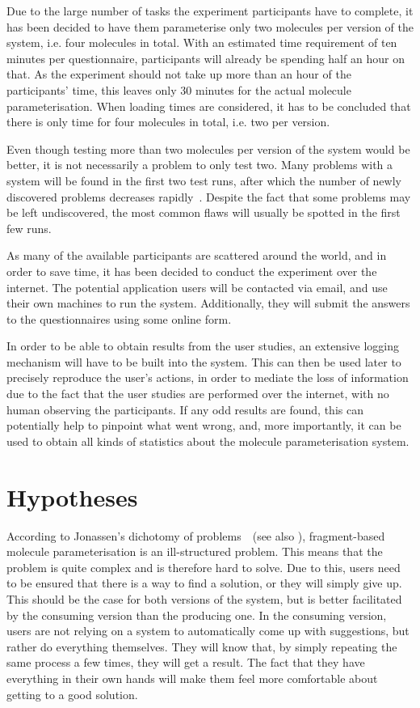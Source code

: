 Due to the large number of tasks the experiment participants have to complete, it has been decided to have them parameterise only two molecules per version of the system, i.e. four molecules in total. With an estimated time requirement of ten minutes per questionnaire, participants will already be spending half an hour on that. As the experiment should not take up more than an hour of the participants' time, this leaves only 30 minutes for the actual molecule parameterisation. When loading times are considered, it has to be concluded that there is only time for four molecules in total, i.e. two per version.

Even though testing more than two molecules per version of the system would be better, it is not necessarily a problem to only test two. Many problems with a system will be found in the first two test runs, after which the number of newly discovered problems decreases rapidly~\cite{krug2006dont, nielsen2000you}. Despite the fact that some problems may be left undiscovered, the most common flaws will usually be spotted in the first few runs.

As many of the available participants are scattered around the world, and in order to save time, it has been decided to conduct the experiment over the internet. The potential application users will be contacted via email, and use their own machines to run the system. Additionally, they will submit the answers to the questionnaires using some online form.

In order to be able to obtain results from the user studies, an extensive logging mechanism will have to be built into the system. This can then be used later to precisely reproduce the user's actions, in order to mediate the loss of information due to the fact that the user studies are performed over the internet, with no human observing the participants. If any odd results are found, this can potentially help to pinpoint what went wrong, and, more importantly, it can be used to obtain all kinds of statistics about the molecule parameterisation system.



\section{Hypotheses}
According to Jonassen's dichotomy of problems~\cite{jonassen2000toward}~(see also ), fragment-based molecule parameterisation is an ill-structured problem. This means that the problem is quite complex and is therefore hard to solve. Due to this, users need to be ensured that there is a way to find a solution, or they will simply give up. This should be the case for both versions of the system, but is better facilitated by the consuming version than the producing one. In the consuming version, users are not relying on a system to automatically come up with suggestions, but rather do everything themselves. They will know that, by simply repeating the same process a few times, they will get a result. The fact that they have everything in their own hands will make them feel more comfortable about getting to a good solution.

